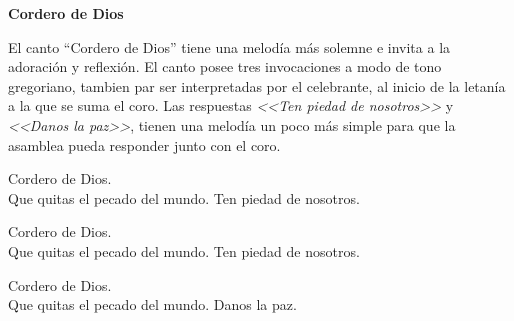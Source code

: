 \documentclass[12pt, letterpaper]{report}
\begin{document}



    \begin{center}
      \LARGE \textbf{Cordero de Dios}
    \end{center}

    \Large El canto ``Cordero de Dios'' tiene una melod\'ia m\'as solemne e invita a la adoraci\'on y reflexi\'on. El canto posee tres invocaciones a modo de tono gregoriano, tambien par ser interpretadas por el celebrante, al inicio de la letan\'ia a la que se suma el coro. Las respuestas \textit{<<Ten piedad de nosotros>>} y \textit{<<Danos la paz>>}, tienen una melod\'ia un poco m\'as simple para que la asamblea pueda responder junto con el coro.

    \noindent
    \LARGE Cordero de Dios.\\
    Que quitas el pecado del mundo. Ten piedad de nosotros.

    \noindent
    \LARGE Cordero de Dios.\\
    Que quitas el pecado del mundo. Ten piedad de nosotros.

    \noindent
    \LARGE Cordero de Dios.\\
    Que quitas el pecado del mundo. Danos la paz.
    \clearpage



\end{document}
